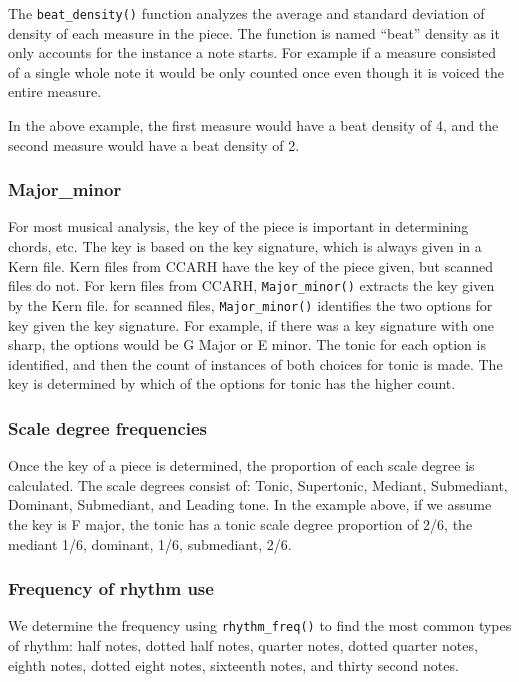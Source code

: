 \documentclass[12pt,twoside]{reedthesis}
\theoremstyle{definition}
\theoremstyle{definition}
\theoremstyle{definition}
\theoremstyle{remark}
\begin{document}
The \texttt{beat\_density()} function analyzes the average and standard
deviation of density of each measure in the piece. The function is named
``beat'' density as it only accounts for the instance a note starts. For
example if a measure consisted of a single whole note it would be only
counted once even though it is voiced the entire measure.

In the above example, the first measure would have a beat density of 4,
and the second measure would have a beat density of 2.

\subsubsection{Major\_minor}\label{major_minor}

For most musical analysis, the key of the piece is important in
determining chords, etc. The key is based on the key signature, which is
always given in a Kern file. Kern files from CCARH have the key of the
piece given, but scanned files do not. For kern files from CCARH,
\texttt{Major\_minor()} extracts the key given by the Kern file. for
scanned files, \texttt{Major\_minor()} identifies the two options for
key given the key signature. For example, if there was a key signature
with one sharp, the options would be G Major or E minor. The tonic for
each option is identified, and then the count of instances of both
choices for tonic is made. The key is determined by which of the options
for tonic has the higher count.

\subsubsection{Scale degree frequencies}\label{scale-degree-frequencies}

Once the key of a piece is determined, the proportion of each scale
degree is calculated. The scale degrees consist of: Tonic, Supertonic,
Mediant, Submediant, Dominant, Submediant, and Leading tone. In the
example above, if we assume the key is F major, the tonic has a tonic
scale degree proportion of 2/6, the mediant 1/6, dominant, 1/6,
submediant, 2/6.

\subsubsection{Frequency of rhythm use}\label{frequency-of-rhythm-use}

We determine the frequency using \texttt{rhythm\_freq()} to find the
most common types of rhythm: half notes, dotted half notes, quarter
notes, dotted quarter notes, eighth notes, dotted eight notes, sixteenth
notes, and thirty second notes.
\end{document}
